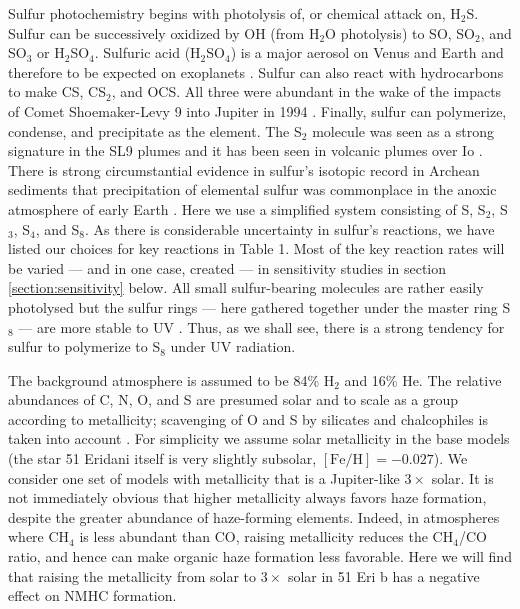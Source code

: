\documentclass[preprint]{aastex}
\newcounter{reaction}
\begin{document}
Sulfur photochemistry begins with photolysis of, or chemical attack on, H$_2$S.
Sulfur can be successively oxidized by OH (from H$_2$O photolysis) to SO, SO$_2$, and SO$_3$ or H$_2$SO$_4$.
Sulfuric acid (H$_2$SO$_4$) is a major aerosol on Venus and
Earth {\color{red} and therefore to be expected on exoplanets \citep{Hu2013}}.  
Sulfur can also react with hydrocarbons to make CS, CS$_2$, and OCS.  All three were abundant in the wake
of the impacts of Comet Shoemaker-Levy 9 into Jupiter in 1994 \citep{Harrington2004}. 
Finally, sulfur can polymerize, condense, and precipitate as the element.
The S$_2$ molecule was seen as a strong signature in the SL9 plumes \citep{Moses1995,Zahnle1995}
and it has been seen in volcanic plumes over Io \citep{Spencer2000}. 
There is strong circumstantial evidence in sulfur's isotopic record in Archean sediments that precipitation of elemental sulfur
was commonplace in the anoxic atmosphere of early Earth \citep{Pavlov2002}.
Here we use a simplified system consisting of S, S$_2$, S$_3$, S$_4$, and S$_8$.
As there is considerable uncertainty in sulfur's reactions, we have listed our choices for key reactions in Table 1.
Most of the key reaction rates will be varied --- and in one case, created --- in sensitivity studies in section \ref{section:sensitivity} below.
All small sulfur-bearing molecules are rather easily photolysed but the sulfur rings
--- here gathered together under the master ring S$_8$ --- are
more stable to UV \citep{Young1983,Kasting1989,Yung2009}.
Thus, as we shall see, there is a strong tendency for sulfur to polymerize to S$_8$ under UV radiation. 


The background atmosphere is assumed to be 84\% H$_2$ and 16\% He.
The relative abundances of C, N, O, and S are presumed solar and to scale as a group according to metallicity;
scavenging of O and S by silicates and chalcophiles is taken into account \citep{Lodders2006}.
For simplicity we assume solar metallicity in the base models
(the star 51 Eridani itself is very slightly subsolar, $\left[\mathrm{Fe}/\mathrm{H}\right]=-0.027$).
We consider one set of models with metallicity that is a Jupiter-like $3\times$ solar. 
It is not immediately obvious that higher metallicity always favors haze formation,
despite the greater abundance of haze-forming elements. 
Indeed, in atmospheres where CH$_4$ is less abundant than CO, raising metallicity reduces the CH$_4$/CO
ratio, and hence can make organic haze formation less favorable.
Here we will find that raising the metallicity from solar to $3\times$ solar in 51 Eri b 
has a negative effect on NMHC formation.
\end{document}
